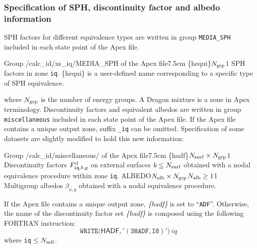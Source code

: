 \subsubsection{Specification of SPH, discontinuity factor and albedo information}\label{sect:df_apx}

SPH factors for different equivalence types are written in group {\tt MEDIA\_SPH} included in each state point of the Apex file.

\vskip -0.15cm

\begin{DescriptionEnregistrement}{Group /calc\_id/xs\_iq/MEDIA\_SPH of the Apex file}{7.5cm}
\label{tabl:tabiso202a}
\RealEnr
  {\{hequi\}}{$N_{\rm grp}$}{$1$}
  {SPH factors in zone {\tt iq}. \{hequi\} is a user-defined name corresponding to a specific type of SPH equivalence.}
\end{DescriptionEnregistrement}

\noindent where $N_{\rm grp}$ is the number of energy groups. A Dragon mixture is a zone in Apex terminology. Discontinuity factors and
equivalent albedos are written in group {\tt miscellaneous} included in each state point of the Apex file.
If the Apex file contains a unique output zone, suffix {\tt \_iq} can be omitted. Specification of some datasets are slightly modified to hold this new information:

\vskip -0.15cm

\begin{DescriptionEnregistrement}{Group /calc\_id/miscellaneous/ of the Apex file}{7.5cm}
\label{tabl:tabiso202a}
\RealEnr
  {\{hadf\}}{$N_{\rm surf}\times N_{\rm grp}$}{$1$}
  {Discontinuity factors $F^{\rm d}_{{\tt iq},b,g}$ on external surfaces $b\le N_{\rm surf}$ obtained with a nodal equivalence procedure within zone {\tt iq}.}
\OptRealEnr
  {ALBEDO}{$N_{\rm alb}\times N_{\rm grp}$}{$N_{\rm alb}\ge 1$}{1}
  {Multigroup albedos $\beta_{a,g}$ obtained with a nodal equivalence procedure.}
\end{DescriptionEnregistrement}

\vskip -0.3cm

If the Apex file contains a unique output zone, {\sl \{hadf\}} is set to ``{\tt ADF}''. Otherwise, the name of the discontinuity
factor set {\sl \{hadf\}} is composed using the following FORTRAN instruction:
  \begin{displaymath}
    \mathtt{WRITE(}\mathsf{HADF}\mathtt{,'(3HADF,I8)')} \ iq
  \end{displaymath}
\noindent where {\tt iq} $\le N_{\rm mil}$.

\clearpage
